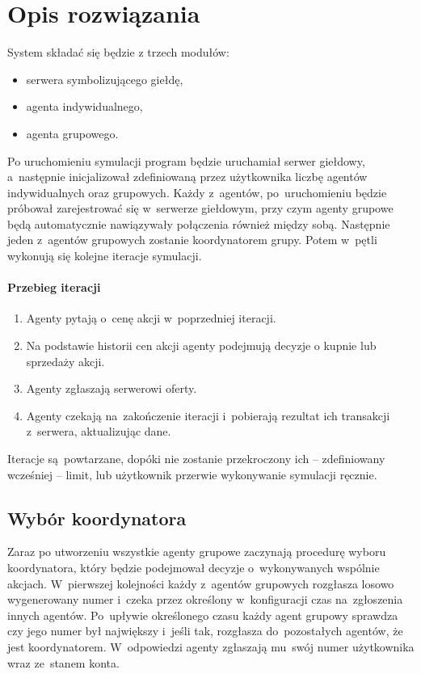 \documentclass[11pt,a4paper]{article}
\begin{document}
\section{Opis rozwiązania}
System składać się będzie z trzech modułów:
\begin{itemize}
  \item serwera symbolizującego giełdę,
  \item agenta indywidualnego,
  \item agenta grupowego.
\end{itemize}

Po uruchomieniu symulacji program będzie uruchamiał serwer giełdowy, a~następnie inicjalizował zdefiniowaną przez użytkownika liczbę agentów indywidualnych oraz grupowych. Każdy z~agentów, po~uruchomieniu będzie próbował zarejestrować się w~serwerze giełdowym, przy czym agenty grupowe będą automatycznie nawiązywały połączenia również między sobą. Następnie jeden z~agentów grupowych zostanie koordynatorem grupy. Potem w~pętli wykonują się kolejne iteracje symulacji.

\paragraph{Przebieg iteracji}
\begin{enumerate}
  \item Agenty pytają o~cenę akcji w~poprzedniej iteracji.
  \item Na podstawie historii cen akcji agenty podejmują decyzje o kupnie lub sprzedaży akcji.
  \item Agenty zgłaszają serwerowi oferty.
  \item Agenty czekają na~zakończenie iteracji i~pobierają rezultat ich transakcji z~serwera, aktualizując dane.
\end{enumerate}

Iteracje są~powtarzane, dopóki nie zostanie przekroczony ich -- zdefiniowany wcześniej -- limit, lub użytkownik przerwie wykonywanie symulacji ręcznie.

\subsection{Wybór koordynatora}
Zaraz po utworzeniu wszystkie agenty grupowe zaczynają procedurę wyboru koordynatora, który będzie podejmował
decyzje o~wykonywanych wspólnie akcjach. W~pierwszej kolejności każdy z~agentów grupowych rozgłasza losowo
wygenerowany numer i~czeka przez określony w~konfiguracji czas na~zgłoszenia innych agentów. Po~upływie
określonego czasu każdy agent grupowy sprawdza czy jego numer był największy i~jeśli tak, rozgłasza
do~pozostałych agentów, że jest koordynatorem. W~odpowiedzi agenty zgłaszają mu~swój numer użytkownika wraz ze~stanem konta.
\end{document}

